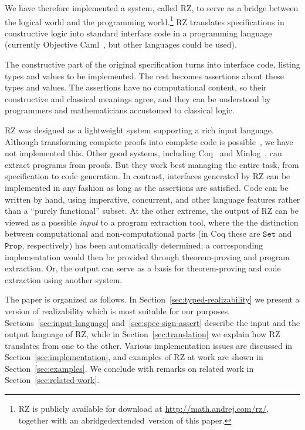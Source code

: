 
We have therefore implemented a system, called RZ, to serve as a
bridge between the logical world and the programming
world.\footnote{RZ is publicly available for download at
  \url{http://math.andrej.com/rz/}, together with an \iflong
  abridged\else extended\fi\ version of this paper.} RZ translates
specifications in constructive logic into standard interface code in a
programming language (currently Objective Caml~\cite{ocaml}, but other
languages could be used).

The constructive part of the original specification turns into
interface code, listing types and values to be implemented. The rest
becomes assertions about these types and values. The assertions have
no computational content, so their constructive and classical meanings
agree, and they can be understood by programmers and mathematicians
accustomed to classical logic.


RZ was designed as a lightweight system
supporting a rich input language. Although transforming complete
proofs into complete code is possible~\cite{komagata+:tr95}, we have not
implemented this. Other good systems, including Coq~\cite{coqart} and
Minlog~\cite{benl98:_proof_theor_work}, can
extract programs from proofs. But they work best managing the entire
task, from specification to code generation. In contrast, interfaces generated by RZ can be
implemented in any fashion as long as the assertions are satisfied.
Code can be written by hand, using imperative, concurrent, and other language features
rather than a ``purely functional'' subset. 
\iflong
At the other
extreme, the output of RZ can be viewed as a possible \emph{input} to
a program extraction tool, where the the distinction between
computational and non-computational parts (in Coq these are
$\mathtt{Set}$ and $\mathtt{Prop}$, respectively) has been
automatically determined; a corresponding implementation would then be
provided through theorem-proving and program extraction.
\else %
Or, the output can serve as a basis for theorem-proving and code
extraction using another system.
\fi

\iflong
The paper is organized as follows. In
Section~\ref{sec:typed-realizability} we present a version of
realizability which is most suitable for our purposes.
Sections~\ref{sec:input-language} and~\ref{sec:spec-sign-assert}
describe the input and the output language of RZ, while in
Section~\ref{sec:translation} we explain how RZ translates from one to
the other. Various implementation issues are discussed in
Section~\ref{sec:implementation}, and examples of RZ at work are shown
in Section~\ref{sec:examples}. We conclude with remarks on related
work in Section~\ref{sec:related-work}.
\fi %


